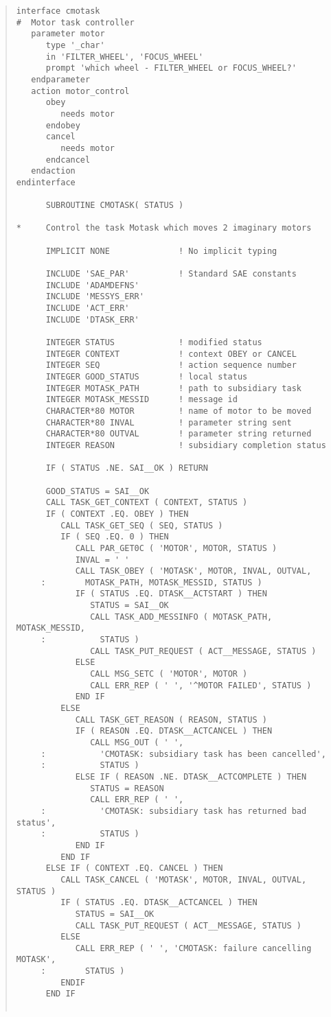 \documentclass[twoside,11pt]{article}
\renewcommand{\_}{\texttt{\symbol{95}}}
\begin{document}
\small \begin{quote} \begin{verbatim}
interface cmotask
#  Motor task controller
   parameter motor
      type '_char'
      in 'FILTER_WHEEL', 'FOCUS_WHEEL'
      prompt 'which wheel - FILTER_WHEEL or FOCUS_WHEEL?'
   endparameter
   action motor_control
      obey
         needs motor
      endobey
      cancel
         needs motor
      endcancel
   endaction
endinterface

      SUBROUTINE CMOTASK( STATUS )

*     Control the task Motask which moves 2 imaginary motors

      IMPLICIT NONE              ! No implicit typing

      INCLUDE 'SAE_PAR'          ! Standard SAE constants
      INCLUDE 'ADAMDEFNS'
      INCLUDE 'MESSYS_ERR'
      INCLUDE 'ACT_ERR'
      INCLUDE 'DTASK_ERR'

      INTEGER STATUS             ! modified status
      INTEGER CONTEXT            ! context OBEY or CANCEL
      INTEGER SEQ                ! action sequence number
      INTEGER GOOD_STATUS        ! local status
      INTEGER MOTASK_PATH        ! path to subsidiary task
      INTEGER MOTASK_MESSID      ! message id
      CHARACTER*80 MOTOR         ! name of motor to be moved
      CHARACTER*80 INVAL         ! parameter string sent
      CHARACTER*80 OUTVAL        ! parameter string returned
      INTEGER REASON             ! subsidiary completion status

      IF ( STATUS .NE. SAI__OK ) RETURN

      GOOD_STATUS = SAI__OK
      CALL TASK_GET_CONTEXT ( CONTEXT, STATUS )
      IF ( CONTEXT .EQ. OBEY ) THEN
         CALL TASK_GET_SEQ ( SEQ, STATUS )
         IF ( SEQ .EQ. 0 ) THEN
            CALL PAR_GET0C ( 'MOTOR', MOTOR, STATUS )
            INVAL = ' '
            CALL TASK_OBEY ( 'MOTASK', MOTOR, INVAL, OUTVAL,
     :        MOTASK_PATH, MOTASK_MESSID, STATUS )
            IF ( STATUS .EQ. DTASK__ACTSTART ) THEN
               STATUS = SAI__OK
               CALL TASK_ADD_MESSINFO ( MOTASK_PATH, MOTASK_MESSID,
     :           STATUS )
               CALL TASK_PUT_REQUEST ( ACT__MESSAGE, STATUS )
            ELSE
               CALL MSG_SETC ( 'MOTOR', MOTOR )
               CALL ERR_REP ( ' ', '^MOTOR FAILED', STATUS )
            END IF
         ELSE
            CALL TASK_GET_REASON ( REASON, STATUS )
            IF ( REASON .EQ. DTASK__ACTCANCEL ) THEN
               CALL MSG_OUT ( ' ',
     :           'CMOTASK: subsidiary task has been cancelled',
     :           STATUS )
            ELSE IF ( REASON .NE. DTASK__ACTCOMPLETE ) THEN
               STATUS = REASON
               CALL ERR_REP ( ' ',
     :           'CMOTASK: subsidiary task has returned bad status',
     :           STATUS )
            END IF
         END IF
      ELSE IF ( CONTEXT .EQ. CANCEL ) THEN
         CALL TASK_CANCEL ( 'MOTASK', MOTOR, INVAL, OUTVAL, STATUS )
         IF ( STATUS .EQ. DTASK__ACTCANCEL ) THEN
            STATUS = SAI__OK
            CALL TASK_PUT_REQUEST ( ACT__MESSAGE, STATUS )
         ELSE
            CALL ERR_REP ( ' ', 'CMOTASK: failure cancelling MOTASK',
     :        STATUS )
         ENDIF
      END IF


\end{verbatim}
\end{quote}
\end{document}
